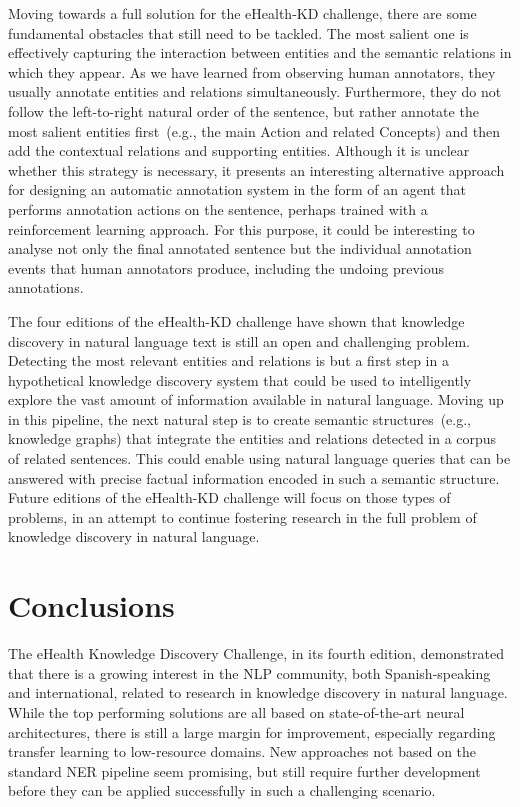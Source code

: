 \documentclass[a4paper,11pt,twocolumn,twoside]{article}
\begin{document}
Moving towards a full solution for the eHealth-KD challenge, there are some fundamental obstacles that still need to be tackled.
The most salient one is effectively capturing the interaction between entities and the semantic relations in which they appear.
As we have learned from observing human annotators, they usually annotate entities and relations simultaneously.
Furthermore, they do not follow the left-to-right natural order of the sentence, but rather annotate the most salient entities first~(e.g., the main Action and related Concepts) and then add the contextual relations and supporting entities.
Although it is unclear whether this strategy is necessary, it presents an interesting alternative approach for designing an automatic annotation system in the form of an agent that performs annotation actions on the sentence, perhaps trained with a reinforcement learning approach.
For this purpose, it could be interesting to analyse not only the final annotated sentence but the individual annotation events that human annotators produce, including the undoing previous annotations.

The four editions of the eHealth-KD challenge have shown that knowledge discovery in natural language text is still an open and challenging problem.
Detecting the most relevant entities and relations is but a first step in a hypothetical knowledge discovery system that could be used to intelligently explore the vast amount of information available in natural language.
Moving up in this pipeline, the next natural step is to create semantic structures~(e.g., knowledge graphs) that integrate the entities and relations detected in a corpus of related sentences.
This could enable using natural language queries that can be answered with precise factual information encoded in such a semantic structure.
Future editions of the eHealth-KD challenge will focus on those types of problems, in an attempt to continue fostering research in the full problem of knowledge discovery in natural language.

\section{Conclusions}\label{sec:conclusions}

The eHealth Knowledge Discovery Challenge, in its fourth edition, demonstrated that there is a growing interest in the NLP community, both Spanish-speaking and international, related to research in knowledge discovery in natural language.
While the top performing solutions are all based on state-of-the-art neural architectures, there is still a large margin for improvement, especially regarding transfer learning to low-resource domains.
New approaches not based on the standard NER pipeline seem promising, but still require further development before they can be applied successfully in such a challenging scenario.
\end{document}
